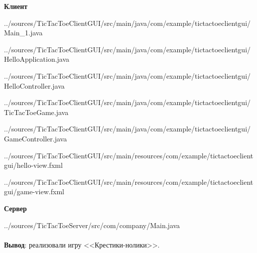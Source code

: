 \documentclass[12pt, a4paper, simple]{eskdtext}
\begin{document}
    \begin{center}
        \textbf{Клиент}
    \end{center}

    
    {../sources/TicTacToeClientGUI/src/main/java/com/example/tictactoeclientgui/Main_1.java}
    
    {../sources/TicTacToeClientGUI/src/main/java/com/example/tictactoeclientgui/HelloApplication.java}
    
    {../sources/TicTacToeClientGUI/src/main/java/com/example/tictactoeclientgui/HelloController.java}
    
    {../sources/TicTacToeClientGUI/src/main/java/com/example/tictactoeclientgui/TicTacToeGame.java}
    
    {../sources/TicTacToeClientGUI/src/main/java/com/example/tictactoeclientgui/GameController.java}
    
    {../sources/TicTacToeClientGUI/src/main/resources/com/example/tictactoeclientgui/hello-view.fxml}
    
    {../sources/TicTacToeClientGUI/src/main/resources/com/example/tictactoeclientgui/game-view.fxml}

    \begin{center}
        \textbf{Сервер}
    \end{center}

    
    {../sources/TicTacToeServer/src/com/company/Main.java}


    \paragraph{} \textbf{Вывод}: реализовали игру <<Крестики-нолики>>.

\end{document}
